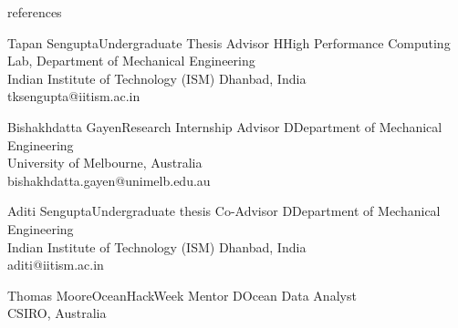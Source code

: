 \documentclass{resume} %
\begin{document}
\begin{rSection}{references}

\begin{rSubsection}{Tapan Sengupta}{Undergraduate Thesis Advisor}{}
HHigh Performance Computing Lab, Department of Mechanical Engineering\\
Indian Institute of Technology (ISM) Dhanbad, India\\
tksengupta@iitism.ac.in\\

\end{rSubsection}

\begin{rSubsection}{Bishakhdatta Gayen}{Research Internship Advisor}{}
DDepartment of Mechanical Engineering\\
University of Melbourne, Australia\\
bishakhdatta.gayen@unimelb.edu.au\\

\end{rSubsection}

\begin{rSubsection}{Aditi Sengupta}{Undergraduate thesis Co-Advisor}{}
DDepartment of Mechanical Engineering\\
Indian Institute of Technology (ISM) Dhanbad, India\\
aditi@iitism.ac.in\\

\end{rSubsection}

\begin{rSubsection}{Thomas Moore}{OceanHackWeek Mentor}{}
DOcean Data Analyst\\
CSIRO, Australia\\
\href{https://people.csiro.au/M/T/Thomas-Moore}\\

\end{rSubsection}

\end{rSection}





\end{document}
